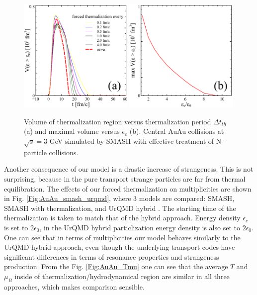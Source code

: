 \begin{figure}
  \centering
  \includegraphics[width=0.49\textwidth]{plots/forced_thermalization/Vec_vs_dt.pdf}
  \includegraphics[width=0.49\textwidth]{plots/forced_thermalization/maxV_vs_ec.pdf}
  \caption{Volume of thermalization region versus thermalization period $\Delta
           t_{th}$ (a) and maximal volume versus $\epsilon_c$ (b). Central AuAu collisions
           at $\sqrt{s} = 3$ GeV simulated by SMASH with effective treatment of N-particle
           collisions.}
  \label{Fig:AuAu_Vec}
\end{figure}

Another consequence of our model is a drastic increase of strangeness. This is
not surprising, because in the pure transport strange particles are far from
thermal equilibration. The effects of our forced thermalization on
multiplicities are shown in Fig. \ref{Fig:AuAu_smash_urqmd}, where 3
models are compared: SMASH, SMASH with thermalization, and UrQMD hybrid
\cite{Petersen:2008dd}. The starting time of the thermalization is taken to
match that of the hybrid approach. Energy density $\epsilon_c$ is set to
$2\epsilon_0$, in the UrQMD hybrid particlization energy density is also set to
$2\epsilon_0$. One can see that in terms of multiplicities our model behaves
similarly to the UrQMD hybrid approach, even though the underlying transport
codes have significant differences in terms of resonance properties and
strangeness production. From the Fig. \ref{Fig:AuAu_Tmu} one can see that the
average $T$ and $\mu_B$ inside of thermalization/hydrodynamical region are
similar in all three approaches, which makes comparison sensible.



